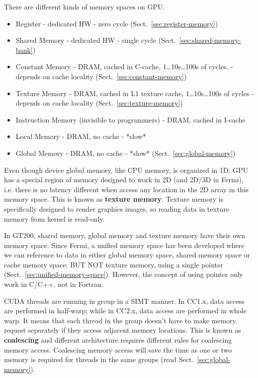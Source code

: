 There are different kinds of memory spaces on GPU. 
\begin{itemize}
\item Register - dedicated HW - zero cycle
  (Sect.~\ref{sec:register-memory})
\item Shared Memory - dedicated HW - single cycle
  (Sect.~\ref{sec:shared-memory-bank})
\item Constant Memory - DRAM, cached in C-cache, 1\ldots 10s\ldots 100s of cycles,
  - depends on cache locality (Sect.~\ref{sec:constant-memory})
\item Texture Memory - DRAM, cached in L1 texture cache, 1\ldots 10s\ldots 100s of
  cycles - depends on cache locality (Sect.~\ref{sec:texture-memory})
\item Instruction Memory (invisible to programmers) - DRAM, cached in
  I-cache
\item Local Memory - DRAM, no cache - *slow*
\item Global Memory - DRAM, no cache - *slow*
  (Sect.~\ref{sec:global-memory}) 
\end{itemize}

\begin{framed}
  Even though device global memory, like CPU memory, is organized in
  1D. GPU has a special region of memory designed to work in 2D (and
  2D/3D in Fermi), i.e. there is no latency different when access any
  location in the 2D array in this memory space. This is known as
  {\bf texture memory}. Texture memory is specifically designed to
  render graphics images, so reading data in texture memory from
  kernel is read-only.
\end{framed}

In GT200, shared memory, global memory and texture memory have their
own memory space. Since Fermi, a unified memory space has been
developed where we can reference to data in either global memory
space, shared memory space or cache memory space; BUT NOT texture
memory, using a single pointer
(Sect.~\ref{sec:unified-memory-space}). However, the concept of using
pointer only work in C/C++, not in Fortran. 

CUDA threads are running in group in a SIMT manner. In CC1.x, data
access are performed in half-warp; while in CC2.x, data access are
performed in whole warp. It means that each thread in the group
doesn't have to make memory request separately if they access adjacent
memory locations. This is known as {\bf coalescing} and different
architecture requires different rules for coalescing memory
access. Coalescing memory access will save the time as one or two
memory is required for threads in the same groups (read
Sect.~\ref{sec:global-memory}).

